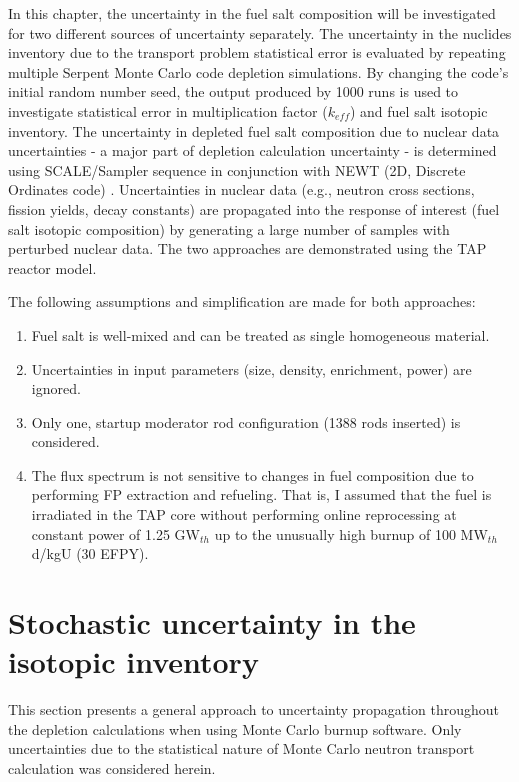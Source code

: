 In this chapter, the uncertainty in the fuel salt composition will be 
investigated for two different sources of uncertainty separately. The 
uncertainty in the nuclides inventory due to the transport problem statistical 
error is evaluated by repeating multiple Serpent Monte Carlo code depletion 
simulations. By changing the code's initial random number seed, the output 
produced by 1000 runs is used to investigate statistical error in 
multiplication factor ($k_{eff}$) and fuel salt isotopic inventory. The 
uncertainty in depleted fuel salt composition due to nuclear data 
uncertainties - a major part of depletion calculation uncertainty - is 
determined using SCALE/Sampler sequence in conjunction with NEWT (2D, Discrete 
Ordinates code) \cite{rearden_scale_2018}. Uncertainties in nuclear data 
(e.g., neutron cross sections, fission yields, decay constants) are propagated 
into the response of interest (fuel salt isotopic composition) by generating a 
large number of samples with perturbed nuclear data. The two approaches are 
demonstrated using the \gls{TAP} reactor model.

The following assumptions and simplification are made for both approaches:
\begin{enumerate}[label=(\alph*), noitemsep, topsep=0pt]
	\item Fuel salt is well-mixed and can be treated as single homogeneous 
	material.
	\item Uncertainties in input parameters (size, density, enrichment, power) 
	are ignored.
	\item Only one, startup moderator rod configuration (1388 rods inserted) 
	is considered.
	\item The flux spectrum is not sensitive to changes in fuel composition 
	due to performing \gls{FP} extraction and refueling. That is, I assumed 
	that the fuel is irradiated in the \gls{TAP} core without performing  
	online reprocessing at constant power of 1.25 GW$_{th}$ up to the 
	unusually high burnup of 100 MW$_{th}$d/kgU (30 \gls{EFPY}).
\end{enumerate}


\section{Stochastic uncertainty in the isotopic inventory} 
\label{sec:uq-stochastic}
This section presents a general approach to uncertainty propagation throughout 
the depletion calculations when using Monte Carlo burnup software. Only 
uncertainties due to the statistical
nature of Monte Carlo neutron transport 
calculation was considered herein. 

